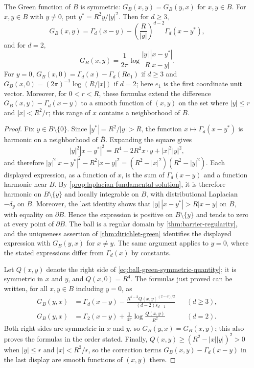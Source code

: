 \begin{lemma}\label{lem:ball-green-symmetry}
The Green function of $B$ is symmetric: $G_B(x,y)=G_B(y,x)$ for $x,y\in B$. For $x,y\in B$ with $y\neq0$, put $y^*=R^2y/|y|^2$. Then for $d\geq3$,
\[
 G_B(x,y)=\Gamma_d(x-y)-\left(\frac R{|y|}\right)^{d-2}\Gamma_d(x-y^*),
\]
and for $d=2$,
\[
 G_B(x,y)=\frac1{2\pi}\log\frac{|y|\,|x-y^*|}{R|x-y|}.
\]
For $y=0$, $G_B(x,0)=\Gamma_d(x)-\Gamma_d(Re_1)$ if $d\geq3$ and $G_B(x,0)=(2\pi)^{-1}\log(R/|x|)$ if $d=2$; here $e_1$ is the first coordinate unit vector. Moreover, for $0<r<R$, these formulas extend the difference $G_B(x,y)-\Gamma_d(x-y)$ to a smooth function of $(x,y)$ on the set where $|y|\leq r$ and $|x|<R^2/r$; this range of $x$ contains a neighborhood of $\overline B$.
\end{lemma}
\begin{proof}
Fix $y\in B\setminus\{0\}$. Since $|y^*|=R^2/|y|>R$, the function $x\mapsto\Gamma_d(x-y^*)$ is harmonic on a neighborhood of $\overline B$. Expanding the square gives
\begin{equation}\label{eq:ball-green-symmetric-quantity}
 |y|^2|x-y^*|^2=R^4-2R^2x\mathbin{\cdot}y+|x|^2|y|^2,
\end{equation}
and therefore $|y|^2|x-y^*|^2-R^2|x-y|^2=(R^2-|x|^2)(R^2-|y|^2)$. Each displayed expression, as a function of $x$, is the sum of $\Gamma_d(x-y)$ and a function harmonic near $\overline B$. By \cref{prop:laplacian-fundamental-solution}, it is therefore harmonic on $B\setminus\{y\}$ and locally integrable on $B$, with distributional Laplacian $-\delta_y$ on $B$. Moreover, the last identity shows that $|y|\,|x-y^*|>R|x-y|$ on $B$, with equality on $\partial B$. Hence the expression is positive on $B\setminus\{y\}$ and tends to zero at every point of $\partial B$. The ball is a regular domain by \cref{thm:barrier-regularity}, and the uniqueness assertion of \cref{thm:dirichlet-green} identifies the displayed expression with $G_B(y,x)$ for $x\neq y$. The same argument applies to $y=0$, where the stated expressions differ from $\Gamma_d(x)$ by constants.

Let $Q(x,y)$ denote the right side of \eqref{eq:ball-green-symmetric-quantity}; it is symmetric in $x$ and $y$, and $Q(x,0)=R^4$. The formulas just proved can be written, for all $x,y\in B$ including $y=0$, as
\[
 \begin{aligned}
 G_B(y,x)&=\Gamma_d(x-y)-\frac{R^{d-2}Q(x,y)^{(2-d)/2}}{(d-2)s_{d-1}}&&(d\geq3),\\
 G_B(y,x)&=\Gamma_2(x-y)+\frac1{4\pi}\log\frac{Q(x,y)}{R^2}&&(d=2).
 \end{aligned}
\]
Both right sides are symmetric in $x$ and $y$, so $G_B(y,x)=G_B(x,y)$; this also proves the formulas in the order stated. Finally, $Q(x,y)\geq(R^2-|x||y|)^2>0$ when $|y|\leq r$ and $|x|<R^2/r$, so the correction terms $G_B(x,y)-\Gamma_d(x-y)$ in the last display are smooth functions of $(x,y)$ there.
\end{proof}

